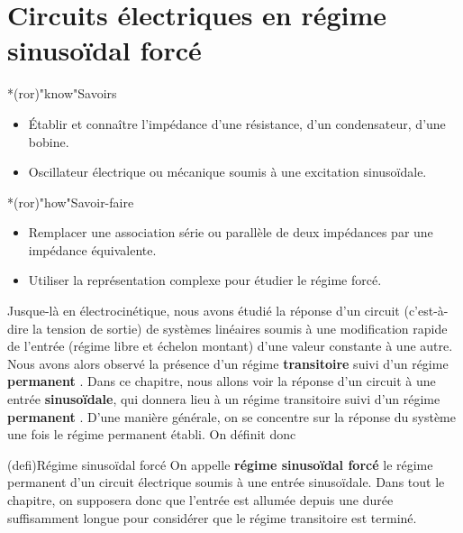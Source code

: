 \documentclass[../../main/main.tex]{subfiles}
\begin{document}
\setcounter{chapter}{4}

\chapter{Circuits \'electriques en r\'egime sinuso\"idal forc\'e}

\vfill

\begin{prgm}
	\begin{tcb}*(ror)"know"{Savoirs}
		\begin{itemize}[label=$\diamond$, leftmargin=10pt]
			\item Établir et connaître l'impédance d'une résistance, d'un
			      condensateur, d'une bobine.
			\item Oscillateur électrique ou mécanique soumis à une excitation
			      sinusoïdale.
		\end{itemize}
	\end{tcb}

	\begin{tcb}*(ror)"how"{Savoir-faire}
		\begin{itemize}[label=$\diamond$, leftmargin=10pt]
			\item Remplacer une association série ou parallèle de deux impédances par
			      une impédance équivalente.
			\item Utiliser la représentation complexe pour étudier le régime forcé.
		\end{itemize}
	\end{tcb}
\end{prgm}

\vfill
\minitoc
\vfill

\newpage

Jusque-là en électrocinétique, nous avons étudié la réponse d'un circuit
(c'est-à-dire la tension de sortie) de systèmes linéaires soumis à une
modification rapide de l'entrée (régime libre et échelon montant) d'une valeur
constante à une autre. Nous avons alors observé la présence d'un régime
\textbf{transitoire} suivi d'un régime \textbf{permanent }.
Dans ce chapitre, nous allons voir la réponse d'un circuit à une entrée
\textbf{sinusoïdale}, qui donnera lieu à un régime transitoire suivi d'un régime
\textbf{permanent }. D'une manière générale, on se
concentre sur la réponse du système une fois le régime permanent établi. On
définit donc

\begin{tcb}[label=def:rsf](defi){Régime sinusoïdal forcé}
	On appelle \textbf{régime sinusoïdal forcé} le régime permanent d'un circuit
	électrique soumis à une entrée sinusoïdale.
	\smallbreak
	Dans tout le chapitre, on supposera donc que l'entrée est allumée depuis une
	durée suffisamment longue pour considérer que le régime transitoire est
	terminé.
	\begin{center}
	\end{center}
\end{tcb}
\end{document}
